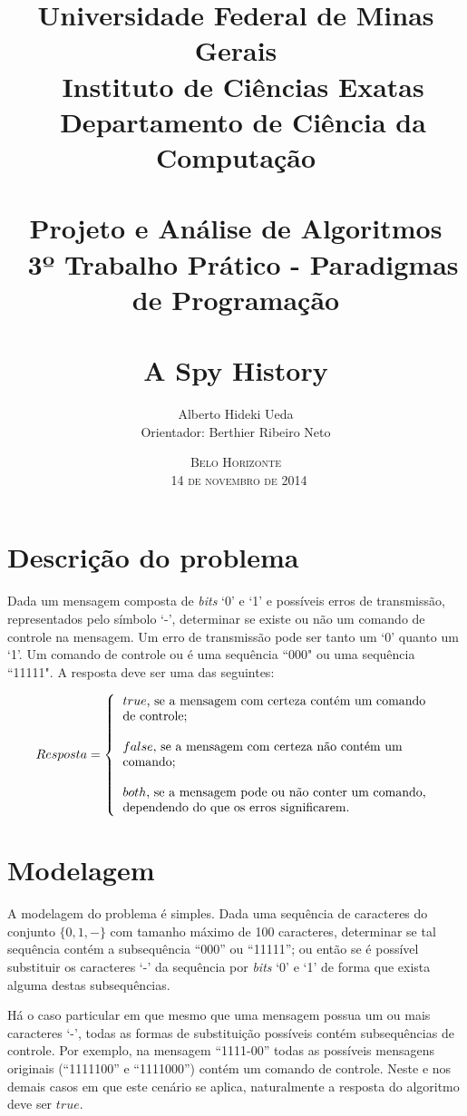 \documentclass[a4paper,12pt,titlepage]{article}
\title{\large
Universidade Federal de Minas Gerais \\ \
Instituto de Ciências Exatas \\ \ 
Departamento de Ciência da Computação \\ \
\\[1cm]
Projeto e Análise de Algoritmos\\ \
3º Trabalho Prático - Paradigmas de Programação\\ \
\\[1cm]
\textbf{\Large A Spy History}
\\[1cm]
}
\author{\large Alberto Hideki Ueda \\[0.5cm] 
	Orientador: Berthier Ribeiro Neto 
\\[3cm] }
\date{\textsc{Belo Horizonte\\ \
14 de novembro de 2014}}
\begin{document}
\maketitle

\pagebreak

\section{Descrição do problema}

Dada um mensagem composta de \textit{bits} `0' e `1' e possíveis erros de transmissão, representados pelo símbolo `-', determinar se existe ou não um comando de controle na mensagem. Um erro de transmissão pode ser tanto um `0' quanto um `1'. Um comando de controle ou é uma sequência ``000" ou uma sequência ``11111". A resposta deve ser uma das seguintes:

\[
Resposta = 
\left \{
\begin{tabular}{lll}
$true$, se a mensagem com certeza contém um comando \\ de controle; \\
\\ 
$false$, se a mensagem com certeza não contém um \\ comando; \\
\\
$both$, se a mensagem pode ou não conter um comando,\\ dependendo do que os erros significarem. 
\end{tabular}
\right.
\]

\section{Modelagem}
A modelagem do problema é simples. Dada uma sequência de caracteres do conjunto $\{0, 1, -\}$ com tamanho máximo de 100 caracteres, determinar se tal sequência contém a subsequência ``000'' ou ``11111''; ou então se é possível substituir os caracteres `-' da sequência por \textit{bits} `0' e `1'  de forma que exista alguma destas subsequências. 

Há o caso particular em que mesmo que uma mensagem possua um ou mais caracteres `-', todas as formas de substituição possíveis contém subsequências de controle. Por exemplo, na mensagem ``1111-00'' todas as possíveis mensagens originais (``1111100'' e ``1111000'') contém um comando de controle. Neste e nos demais casos em que este cenário se aplica, naturalmente a resposta do algoritmo deve ser $true$.
\end{document}
